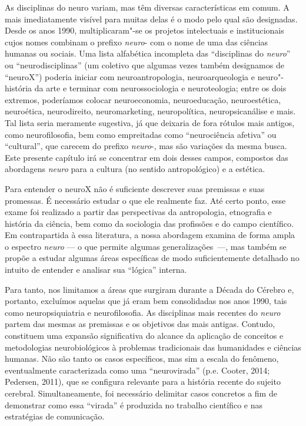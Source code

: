 As disciplinas do neuro variam, mas têm diversas características em
comum. A mais imediatamente visível para muitas delas é o modo pelo qual
são designadas. Desde os anos 1990, multiplicaram"-se os projetos
intelectuais e institucionais cujos nomes combinam o prefixo
\emph{neuro}- com o nome de uma das ciências humanas ou sociais. Uma
lista alfabética incompleta das ``disciplinas do \emph{neuro}'' ou
``neurodisciplinas'' (um coletivo que algumas vezes também designamos de
``neuroX'') poderia iniciar com neuroantropologia, neuroarqueologia e
neuro"-história da arte e terminar com neurossociologia e neuroteologia;
entre os dois extremos, poderíamos colocar neuroeconomia, neuroeducação,
neuroestética, neuroética, neurodireito, neuromarketing, neuropolítica,
neuropsicanálise e mais. Tal lista seria meramente sugestiva, já que
deixaria de fora rótulos mais antigos, como neurofilosofia, bem como
empreitadas como ``neurociência afetiva'' ou ``cultural'', que carecem
do prefixo \emph{neuro}-, mas são variações da mesma busca. Este
presente capítulo irá se concentrar em dois desses campos, compostos das
abordagens \emph{neuro} para a cultura (no sentido antropológico) e a
estética.

Para entender o neuroX não é suficiente descrever suas premissas e suas
promessas. É necessário estudar o que ele realmente faz. Até certo
ponto, esse exame foi realizado a partir das perspectivas da
antropologia, etnografia e história da ciência, bem como da sociologia
das profissões e do campo científico. Em contrapartida à essa
literatura, a nossa abordagem examina de forma ampla o espectro
\emph{neuro} --- o que permite algumas generalizações~---, mas também se
propõe a estudar algumas áreas específicas de modo suficientemente
detalhado no intuito de entender e analisar sua ``lógica'' interna.

Para tanto, nos limitamos a áreas que surgiram durante a Década do
Cérebro e, portanto, excluímos aquelas que já eram bem consolidadas nos
anos 1990, tais como neuropsiquiatria e neurofilosofia. As disciplinas
mais recentes do \emph{neuro} partem das mesmas as premissas e os
objetivos das mais antigas. Contudo, constituem uma expansão
significativa do alcance da aplicação de conceitos e metodologias
neurobiológicos à problemas tradicionais das humanidades e ciências
humanas. Não são tanto os casos específicos, mas sim a escala do
fenômeno, eventualmente caracterizada como uma ``neurovirada'' (p.e.
Cooter, 2014; Pedersen, 2011), que se configura relevante para a
história recente do sujeito cerebral. Simultaneamente, foi necessário
delimitar casos concretos a fim de demonstrar como essa ``virada'' é
produzida no trabalho científico e nas estratégias de comunicação.

